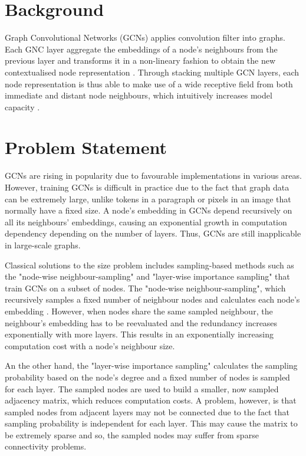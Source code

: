 \chapter{Background}
Graph Convolutional Networks (GCNs) applies convolution filter into graphs. Each GNC layer aggregate the embeddings of a node's neighbours from the previous layer and transforms it in a non-lineary fashion to obtain the new contextualised node representation \cite{assigned_paper_zou2019layer}. Through stacking multiple GCN layers, each node representation is thus able to make use of a wide receptive field from both immediate and distant node neighbours, which intuitively increases model capacity \cite{assigned_paper_zou2019layer}.

\chapter{Problem Statement}
GCNs are rising in popularity due to favourable implementations in various areas. However, training GCNs is difficult in practice due to the fact that graph data can be extremely large, unlike tokens in a paragraph or pixels in an image that normally have a fixed size. A node's embedding in GCNs depend recursively on all its neighbours' embeddings, causing an exponential growth in computation dependency depending on the number of layers. Thus, GCNs are still inapplicable in large-scale graphs.

Classical solutions to the size problem includes sampling-based methods such as the "node-wise neighbour-sampling" and "layer-wise importance sampling" that train GCNs on a subset of nodes. The "node-wise neighbour-sampling", which recursively samples a fixed number of neighbour nodes and calculates each node's embedding \cite{assigned_paper_zou2019layer}. However, when nodes share the same sampled neighbour, the neighbour's embedding has to be reevaluated and the redundancy increases exponentially with more layers. This results in an exponentially increasing computation cost with a node's neighbour size.

An the other hand, the "layer-wise importance sampling" calculates the sampling probability based on the node's degree and a fixed number of nodes is sampled for each layer. The sampled nodes are used to build a smaller, now sampled adjacency matrix, which reduces computation costs. A problem, however, is that sampled nodes from adjacent layers may not be connected due to the fact that sampling probability is independent for each layer. This may cause the matrix to be extremely sparse and so, the sampled nodes may suffer from sparse connectivity problems.

